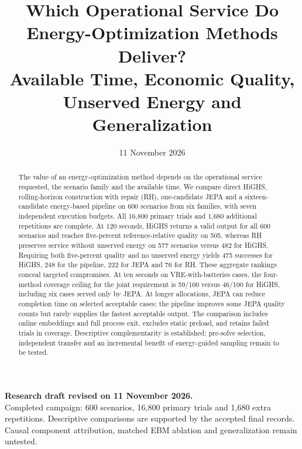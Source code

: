 
\renewcommand{\draftstatus}{\begin{center}\small
  \textbf{Research draft revised on 11 November 2026.}\\
  Completed campaign: 600 scenarios, 16,800 primary trials and 1,680 extra repetitions.
  Descriptive comparisons are supported by the accepted final records.
  Causal component attribution, matched EBM ablation and generalization remain untested.
\end{center}}
\date{11 November 2026}

\title{Which Operational Service Do Energy-Optimization Methods Deliver?\\
Available Time, Economic Quality, Unserved Energy and Generalization}

\maketitle
\draftstatus
\begin{abstract}
The value of an energy-optimization method depends on the operational service
requested, the scenario family and the available time. We compare direct
HiGHS, rolling-horizon construction with repair (RH), one-candidate JEPA and
a sixteen-candidate energy-based pipeline on 600 scenarios from six families,
with seven independent execution budgets. All 16,800 primary trials and 1,680
additional repetitions are complete. At 120 seconds, HiGHS returns a valid
output for all 600 scenarios and reaches five-percent reference-relative
quality on 505, whereas RH preserves service without unserved energy on 577
scenarios versus 482 for HiGHS. Requiring both five-percent quality and no
unserved energy yields 475 successes for HiGHS, 248 for the pipeline, 222 for
JEPA and 76 for RH. These aggregate rankings conceal targeted compromises.
At ten seconds on VRE-with-batteries cases, the four-method coverage ceiling
for the joint requirement is 59/100 versus 46/100 for HiGHS, including six
cases served only by JEPA. At longer allocations, JEPA can reduce completion
time on selected acceptable cases; the pipeline improves some JEPA quality
counts but rarely supplies the fastest acceptable output. The comparison
includes online embeddings and full process exit, excludes static preload,
and retains failed trials in coverage. Descriptive complementarity is
established; pre-solve selection, independent transfer and an incremental
benefit of energy-guided sampling remain to be tested.

\end{abstract}

